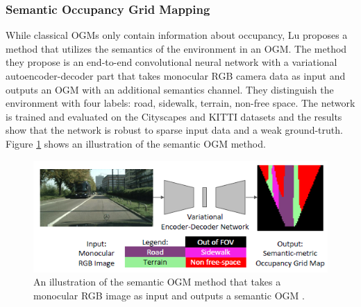 \subsubsection{Semantic Occupancy Grid Mapping}
While classical OGMs only contain information about occupancy, Lu \cite{lu2019monocular} proposes a method that utilizes the semantics of the environment in an \gls{OGM}. The method they propose is an end-to-end convolutional neural network with a variational autoencoder-decoder part that takes monocular RGB camera data as input and outputs an \gls{OGM} with an additional semantics channel. They distinguish the environment with four labels: road, sidewalk, terrain, non-free space. The network is trained and evaluated on the Cityscapes \cite{cordts2016cityscapes} and KITTI \cite{geiger2013vision} datasets and the results show that the network is robust to sparse input data and a weak ground-truth. Figure \ref{fig:sem_OGM} shows an illustration of the semantic \gls{OGM} method.

\begin{figure}[h]
	\centering
	\includegraphics[width=0.7\linewidth]{Figures/Occupancy_Grid_Map/Semantic_OGM_Network}
	\caption{An illustration of the semantic \gls{OGM} method that takes a monocular RGB image as input and outputs a semantic \gls{OGM} \cite{lu2019monocular}.}
	\label{fig:sem_OGM}
\end{figure}



